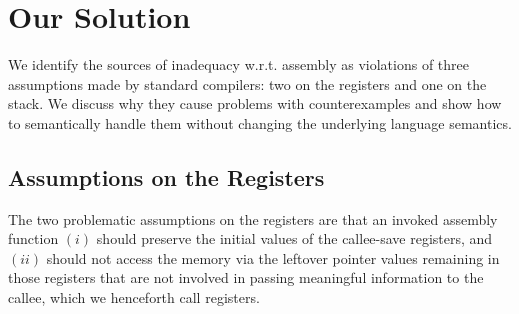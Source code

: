 \section{Our Solution}
\label{sec:compiler:solution}

We identify the sources of inadequacy w.r.t. assembly as violations of
three assumptions made by standard compilers: two on the registers and one on the stack.
We discuss why they 
cause problems with counterexamples and show how to semantically
handle them without changing the underlying language semantics.

\subsection{Assumptions on the Registers}
\label{sec:overview-semantics-register}
%
The two problematic assumptions on the registers are that
an invoked assembly function $(i)$ should
preserve the initial values of the callee-save registers, and $(ii)$
should not access the memory via the leftover pointer values remaining
in those registers that are not involved in passing meaningful information to the callee,
which we henceforth call \emph{\nip{}} registers.

